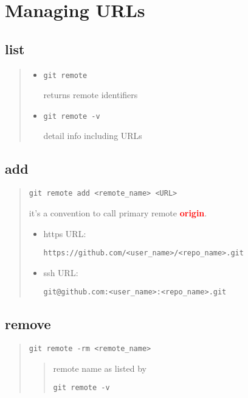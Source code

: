 \documentclass{report}
\begin{document}
\section{Managing URLs}
\subsection{list}
\begin{quote}
\begin{itemize}

\item \begin{verbatim}
git remote
\end{verbatim} 
returns remote identifiers

\item \begin{verbatim}
git remote -v
\end{verbatim}
detail info including URLs

\end{itemize}
\end{quote}

\subsection{add}
\begin{quote}
\begin{verbatim}
git remote add <remote_name> <URL>
\end{verbatim}
it's a convention to call primary remote \textcolor{red}{\textbf{origin}}.\\
\begin{itemize}
\item https URL:
\begin{verbatim}
https://github.com/<user_name>/<repo_name>.git
\end{verbatim}

\item ssh URL:
\begin{verbatim}
git@github.com:<user_name>:<repo_name>.git
\end{verbatim}
\end{itemize}
\end{quote}

\subsection{remove}
\begin{quote}
\begin{verbatim}
git remote -rm <remote_name>
\end{verbatim}
\begin{quote}
remote name as listed by
\begin{verbatim}
git remote -v
\end{verbatim}
\end{quote}
\end{quote}
\end{document}
